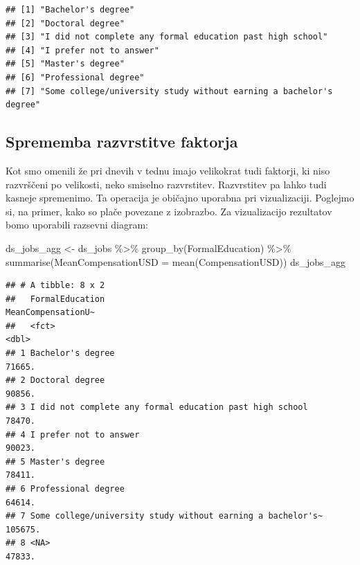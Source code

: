 \documentclass[
]{book}
\newenvironment{Shaded}{\begin{snugshade}}{\end{snugshade}}
\newcommand{\AttributeTok}[1]{\textcolor[rgb]{0.77,0.63,0.00}{#1}}
\newcommand{\FunctionTok}[1]{\textcolor[rgb]{0.00,0.00,0.00}{#1}}
\newcommand{\NormalTok}[1]{#1}
\newcommand{\OtherTok}[1]{\textcolor[rgb]{0.56,0.35,0.01}{#1}}
\newcommand{\SpecialCharTok}[1]{\textcolor[rgb]{0.00,0.00,0.00}{#1}}
\begin{document}
\begin{Shaded}
\end{Shaded}

\begin{verbatim}
## [1] "Bachelor's degree"                                                
## [2] "Doctoral degree"                                                  
## [3] "I did not complete any formal education past high school"         
## [4] "I prefer not to answer"                                           
## [5] "Master's degree"                                                  
## [6] "Professional degree"                                              
## [7] "Some college/university study without earning a bachelor's degree"
\end{verbatim}

\hypertarget{sprememba-razvrstitve-faktorja}{%
\subsection{Sprememba razvrstitve faktorja}\label{sprememba-razvrstitve-faktorja}}

Kot smo omenili že pri dnevih v tednu imajo velikokrat tudi faktorji, ki niso razvrščeni po velikosti, neko smiselno razvrstitev. Razvrstitev pa lahko tudi kasneje spremenimo. Ta operacija je običajno uporabna pri vizualizaciji. Poglejmo si, na primer, kako so plače povezane z izobrazbo. Za vizualizacijo rezultatov bomo uporabili razsevni diagram:

\begin{Shaded}
\begin{Highlighting}[]
\NormalTok{ds\_jobs\_agg }\OtherTok{\textless{}{-}}\NormalTok{ ds\_jobs }\SpecialCharTok{\%\textgreater{}\%}
  \FunctionTok{group\_by}\NormalTok{(FormalEducation) }\SpecialCharTok{\%\textgreater{}\%}
  \FunctionTok{summarise}\NormalTok{(}\AttributeTok{MeanCompensationUSD =} \FunctionTok{mean}\NormalTok{(CompensationUSD))}
\NormalTok{ds\_jobs\_agg}
\end{Highlighting}
\end{Shaded}

\begin{verbatim}
## # A tibble: 8 x 2
##   FormalEducation                                             MeanCompensationU~
##   <fct>                                                                    <dbl>
## 1 Bachelor's degree                                                       71665.
## 2 Doctoral degree                                                         90856.
## 3 I did not complete any formal education past high school                78470.
## 4 I prefer not to answer                                                  90023.
## 5 Master's degree                                                         78411.
## 6 Professional degree                                                     64614.
## 7 Some college/university study without earning a bachelor's~            105675.
## 8 <NA>                                                                    47833.
\end{verbatim}
\end{document}
